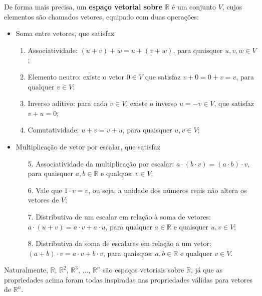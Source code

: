 De forma mais precisa, um \textbf{espaço vetorial sobre $\mathbb{R}$} é um conjunto $V$, cujos elementos são chamados vetores, equipado com duas operações:
\begin{itemize}
	\item Soma entre vetores, que satisfaz
	\begin{enumerate}
		\item Associatividade: $(u+v)+w=u+(v+w)$, para quaisquer $u,v,w \in V$;
		\item Elemento neutro: existe o vetor $0 \in V$ que satisfaz $v+0=0+v=v$, para qualquer $v \in V$;
		\item Inverso aditivo: para cada $v \in V$, existe o inverso $u= -v \in V$, que satisfaz $v+u=0$;
		\item Comutatividade: $u+v = v+u$, para quaisquer $u, v \in V$;
	\end{enumerate}
	\item Multiplicação de vetor por escalar, que satisfaz
	\begin{enumerate}
		\item[5.] Associatividade da multiplicação por escalar: $a\cdot (b\cdot v)=(a\cdot b)\cdot v$, para quaisquer $a,b \in \mathbb{R}$ e qualquer $v \in V$;
		\item[6.] Vale que $1 \cdot v = v$, ou seja, a unidade dos números reais não altera os vetores de $V$;
		\item[7.] Distributiva de um escalar em relação à soma de vetores: $a \cdot (u+v) = a\cdot v+a\cdot u$, para qualquer $a \in \mathbb{R}$ e quaisquer $u,v \in V$;
		\item[8.] Distributiva da soma de escalares em relação a um vetor: $(a+b) \cdot v = a \cdot v+b \cdot v$, para quaisquer $a,b \in \mathbb{R}$ e qualquer $v \in V$.
	\end{enumerate}
\end{itemize}

\begin{ex}
	Naturalmente, $\mathbb{R}$, $\mathbb{R}^2$, $\mathbb{R}^3$, ..., $\mathbb{R}^n$ são espaços vetoriais sobre $\mathbb{R}$, já que as propriedades acima foram todas inspiradas nas propriedades válidas para vetores de $\mathbb{R}^n$.
\end{ex}


